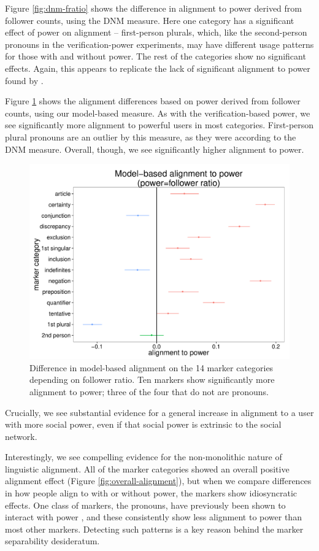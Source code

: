 \documentclass{acm_proc_article-sp}
\begin{document}
Figure \ref{fig:dnm-fratio} shows the difference in alignment to power derived from follower counts, using the DNM measure. Here one category has a significant effect of power on alignment -- first-person plurals, which, like the second-person pronouns in the verification-power experiments, may have different usage patterns for those with and without power.  The rest of the categories show no significant effects.  Again, this appears to replicate the lack of significant alignment to power found by \cite{DNMGamonDumais2011}.

Figure \ref{fig:our-fratio} shows the alignment differences based on power derived from follower counts, using our model-based measure.  As with the verification-based power, we see significantly more alignment to powerful users in most categories. First-person plural pronouns are an outlier by this measure, as they were according to the DNM measure.  Overall, though, we see significantly higher alignment to power.

\begin{figure}[t]
\centering
\includegraphics[width=.9\columnwidth]{graphics/www2016_ourpowerdiff_fratio.pdf}
\caption{Difference in model-based alignment on the 14 marker categories depending on follower ratio. Ten markers show significantly more alignment to power; three of the four that do not are pronouns.}\label{fig:our-fratio}
\end{figure}

  Crucially, we see substantial evidence for a general increase in alignment to a user with more social power, even if that social power is extrinsic to the social network.

Interestingly, we see compelling evidence for the non-monolithic nature of linguistic alignment. All of the marker categories showed an overall positive alignment effect (Figure \ref{fig:overall-alignment}), but when we compare differences in how people align to with or without power, the markers show idiosyncratic effects.  One class of markers, the pronouns, have previously been shown to interact with power \cite{KacewiczEtAl2013}, and these consistently show less alignment to power than most other markers. Detecting such patterns is a key reason behind the marker separability desideratum.
\end{document}
